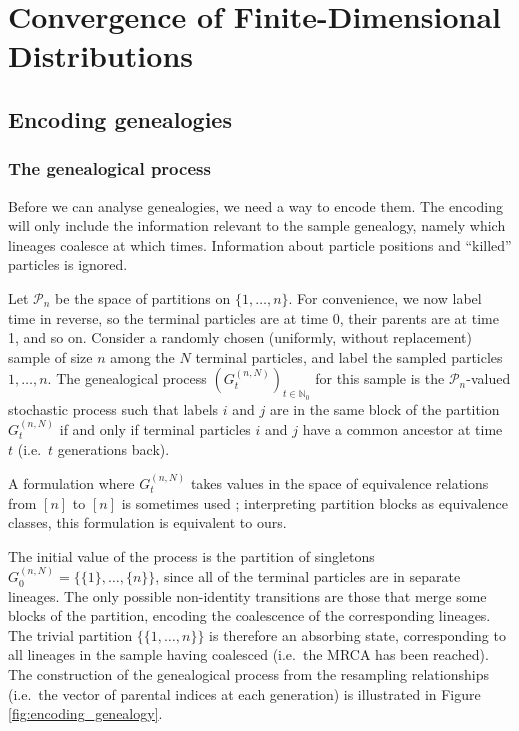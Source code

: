 \chapter{Convergence of Finite-Dimensional Distributions} %
\label{ch:limits}



\section{Encoding genealogies}

\subsection{The genealogical process}
Before we can analyse genealogies, we need a way to encode them.
The encoding will only include the information relevant to the sample genealogy, namely which lineages coalesce at which times. Information about particle positions and ``killed'' particles is ignored.

Let $\mathcal{P}_n$ be the space of partitions on $\{1,\dots,n\}$.
For convenience, we now label time in reverse, so the terminal particles are at time 0, their parents are at time 1, and so on.
Consider a randomly chosen (uniformly, without replacement) sample of size $n$ among the $N$ terminal particles, and label the sampled particles $1,\dots,n$.
The genealogical process $(G_t^{(n,N)})_{t\in\mathbb{N}_0}$ for this sample is the $\mathcal{P}_n$-valued stochastic process such that labels $i$ and $j$ are in the same block of the partition $G_t^{(n,N)}$ if and only if terminal particles $i$ and $j$ have a common ancestor at time $t$ (i.e.\ $t$ generations back).

A formulation where $G_t^{(n,N)}$ takes values in the space of equivalence relations from $[n]$ to $[n]$ is sometimes used \parencite[e.g.][]{mohle1999}; interpreting partition blocks as equivalence classes, this formulation is equivalent to ours.

The initial value of the process is the partition of singletons $G_0^{(n,N)} = \{ \{1\}, \dots, \{n\} \}$, since all of the terminal particles are in separate lineages.
The only possible non-identity transitions are those that merge some blocks of the partition, encoding the coalescence of the corresponding lineages.
The trivial partition $\{ \{1,\dots,n\} \}$ is therefore an absorbing state, corresponding to all lineages in the sample having coalesced (i.e.\ the MRCA has been reached).
The construction of the genealogical process from the resampling relationships (i.e.\ the vector of parental indices at each generation) is illustrated in Figure \ref{fig:encoding_genealogy}.

